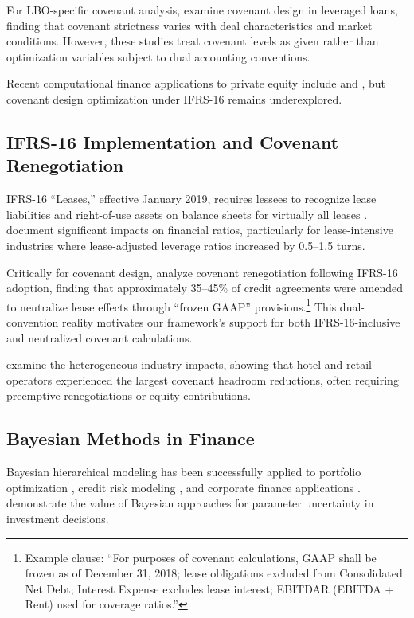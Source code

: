 \documentclass[11pt,a4paper]{article}
\theoremstyle{plain}
\theoremstyle{definition}
\begin{document}
For LBO-specific covenant analysis, \citet{demiroglu2010lbo} examine covenant design in leveraged loans, finding that covenant strictness varies with deal characteristics and market conditions. However, these studies treat covenant levels as given rather than optimization variables subject to dual accounting conventions.

Recent computational finance applications to private equity include \citet{buchner2017simulation} and \citet{ang2018alternative}, but covenant design optimization under IFRS-16 remains underexplored.

\subsection{IFRS-16 Implementation and Covenant Renegotiation}

IFRS-16 ``Leases,'' effective January 2019, requires lessees to recognize lease liabilities and right-of-use assets on balance sheets for virtually all leases \citep{ifrs2016leases}. \citet{fito2022ifrs16} document significant impacts on financial ratios, particularly for lease-intensive industries where lease-adjusted leverage ratios increased by 0.5--1.5 turns.

Critically for covenant design, \citet{grossmann2021ifrs16} analyze covenant renegotiation following IFRS-16 adoption, finding that approximately 35--45\% of credit agreements were amended to neutralize lease effects through ``frozen GAAP'' provisions.\footnote{Example clause: ``For purposes of covenant calculations, GAAP shall be frozen as of December 31, 2018; lease obligations excluded from Consolidated Net Debt; Interest Expense excludes lease interest; EBITDAR (EBITDA + Rent) used for coverage ratios.''} This dual-convention reality motivates our framework's support for both IFRS-16-inclusive and neutralized covenant calculations.

\citet{lakshmanan2021lease} examine the heterogeneous industry impacts, showing that hotel and retail operators experienced the largest covenant headroom reductions, often requiring preemptive renegotiations or equity contributions.

\subsection{Bayesian Methods in Finance}

Bayesian hierarchical modeling has been successfully applied to portfolio optimization \citep{black1992global}, credit risk modeling \citep{kiefer2003default}, and corporate finance applications \citep{graham2015corporate}. \citet{pastor2000comparing} demonstrate the value of Bayesian approaches for parameter uncertainty in investment decisions.
\end{document}
